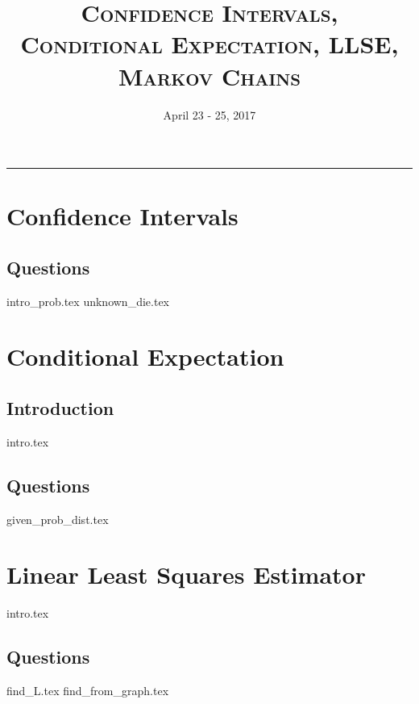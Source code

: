 \documentclass{exam}
\title{\textsc{Confidence Intervals, Conditional Expectation, LLSE, Markov Chains}}
\date{April 23 - 25, 2017}
\begin{document}
\maketitle
\rule{\textwidth}{0.15em}
\fontsize{12}{15}\selectfont
\thispagestyle{empty}


\section{Confidence Intervals}
\subsection{Questions}
\begin{questions}
{intro_prob.tex}
{unknown_die.tex}
\end{questions}

\section{Conditional Expectation}
\subsection{Introduction}
{intro.tex}
\subsection{Questions}
\begin{questions}
{given_prob_dist.tex}
\end{questions}

\section{Linear Least Squares Estimator}
{intro.tex}
\subsection{Questions}
\begin{questions}
{find_L.tex}
{find_from_graph.tex}
\end{questions}
\end{document}
